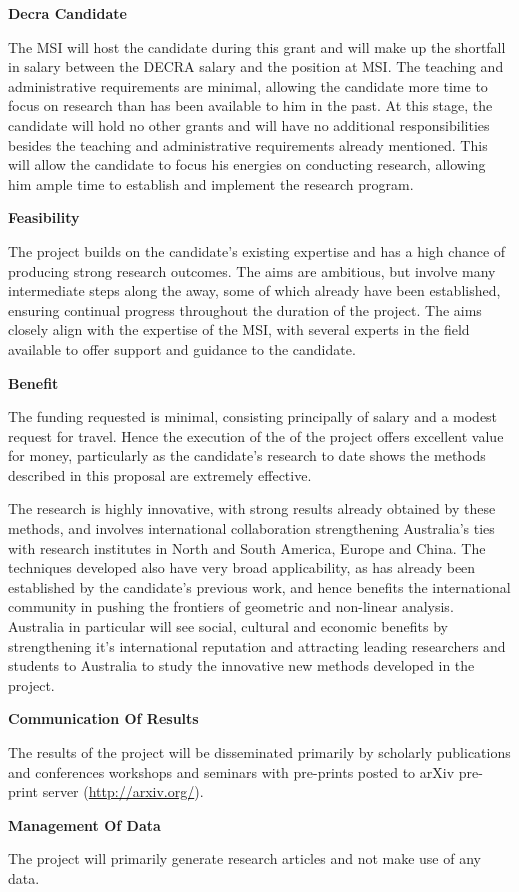 \documentclass[12pt]{amsart}
\begin{document}
\smallskip\noindent\textbf{Decra Candidate}
\label{sec-4}

The MSI will host the candidate during this grant and will make up the shortfall in salary between the DECRA salary and the position at MSI. The teaching and administrative requirements are minimal, allowing the candidate more time to focus on research than has been available to him in the past. At this stage, the candidate will hold no other grants and will have no additional responsibilities besides the teaching and administrative requirements already mentioned. This will allow the candidate to focus his energies on conducting research, allowing him ample time to establish and implement the research program.

\smallskip\noindent\textbf{Feasibility}
\label{sec-5}

The project builds on the candidate's existing expertise and has a high chance of producing strong research outcomes. The aims are ambitious, but involve many intermediate steps along the away, some of which already have been established, ensuring continual progress throughout the duration of the project. The aims closely align with the expertise of the MSI, with several experts in the field available to offer support and guidance to the candidate.

\smallskip\noindent\textbf{Benefit}
\label{sec-6}

The funding requested is minimal, consisting principally of salary and a modest request for travel. Hence the execution of the of the project offers excellent value for money, particularly as the candidate's research to date shows the methods described in this proposal are extremely effective. 

The research is highly innovative, with strong results already obtained by these methods, and involves international collaboration strengthening Australia's ties with research institutes in North and South America, Europe and China. The techniques developed also have very broad applicability, as has already been established by the candidate's previous work, and hence benefits the international community in pushing the frontiers of geometric and non-linear analysis. Australia in particular will see social, cultural and economic benefits by strengthening it's international reputation and attracting leading researchers and students to Australia to study the innovative new methods developed in the project.

\smallskip\noindent\textbf{Communication Of Results}
\label{sec-7}

The results of the project will be disseminated primarily by scholarly publications and conferences workshops and seminars with pre-prints posted to arXiv pre-print server (\url{http://arxiv.org/}).

\smallskip\noindent\textbf{Management Of Data}
\label{sec-8}

The project will primarily generate research articles and not make use of any data.

\printbibliography
\end{document}
